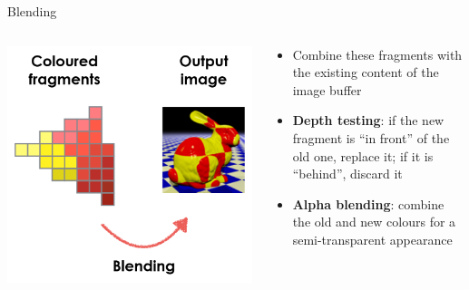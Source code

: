 \begin{frame}{Blending}
	\begin{columns}
		\begin{column}{0.3\textwidth}
			\includegraphics[width=\textwidth]{pipeline_4}
		\end{column}
		\begin{column}{0.65\textwidth}
			\begin{itemize}
				\pause\item Combine these fragments with the existing content of the image buffer
				\pause\item \textbf{Depth testing}: if the new fragment is ``in front'' of the old one, replace it;
					if it is ``behind'', discard it
				\pause\item \textbf{Alpha blending}: combine the old and new colours for a semi-transparent appearance
			\end{itemize}
		\end{column}
	\end{columns}
\end{frame}

